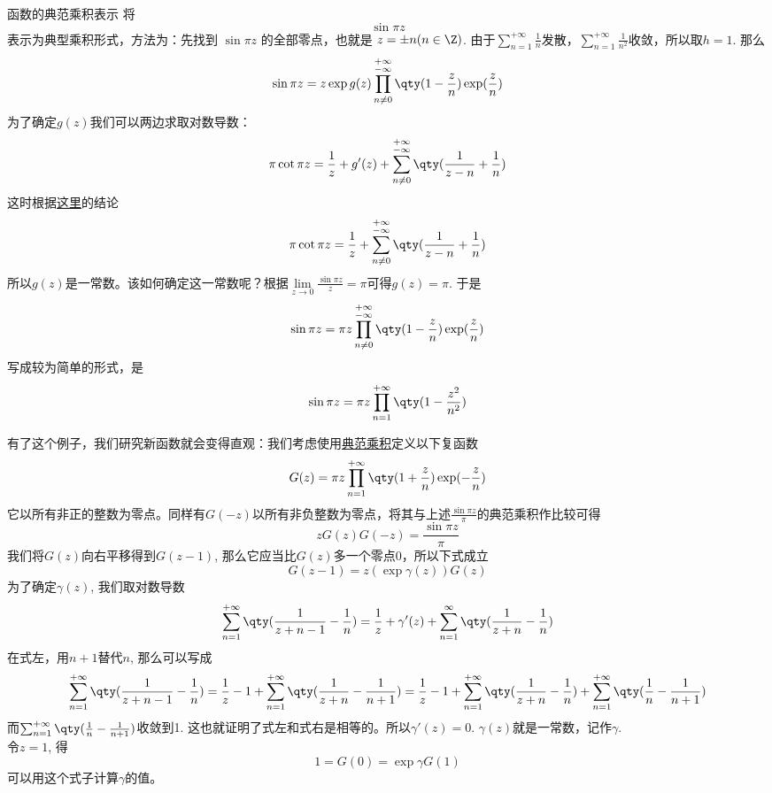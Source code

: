 \documentclass[UTF8]{ctexart}
\begin{document}
        \begin{xmp}
            {函数的典范乘积表示}
            将
            \[\sin \pi z\]
            表示为典型乘积形式，方法为：先找到 \(\sin\pi z\) 的全部零点，也就是 \(z=\pm n(n\in\Z)\). 由于$\sum_{n=1}^{+\infty}\frac{1}{n}$发散，$\sum_{n=1}^{+\infty}\frac{1}{n^2}$收敛，所以取$h=1$. 那么
            \[\sin\pi z=z\exp g(z)\prod_{n\neq 0}^{\substack{+\infty\\ -\infty}}\qty(1-\frac{z}{n})\exp(\frac{z}{n})\]
            为了确定$g(z)$我们可以两边求取对数导数：
            \[\pi\cot\pi z=\frac{1}{z}+g'(z)+\sum_{n\neq 0}^{\substack{+\infty\\ -\infty}}\qty(\frac{1}{z-n}+\frac{1}{n})\]
            这时根据\hyperref[xmp:64]{这里}的结论
            \[\pi\cot\pi z=\frac{1}{z}+\sum_{n\neq 0}^{\substack{+\infty\\ -\infty}}\qty(\frac{1}{z-n}+\frac{1}{n})\]
            所以$g(z)$是一常数。该如何确定这一常数呢？根据$\lim\limits_{z\to 0}\frac{\sin\pi z}{z}=\pi$可得$g(z)=\pi$. 于是
            \[\sin\pi z=\pi z\prod_{n\neq 0}^{\substack{+\infty\\ -\infty}}\qty(1-\frac{z}{n})\exp(\frac{z}{n})\]
            写成较为简单的形式，是
            \[\sin\pi z=\pi z\prod_{n=1}^{+\infty}\qty(1-\frac{z^2}{n^2})\]
        \end{xmp}

        有了这个例子，我们研究新函数就会变得直观：我们考虑使用\hyperref[dfn:CanonicalProduct]{典范乘积}定义以下复函数
        \[G(z)=\pi z\prod_{n=1}^{+\infty}\qty(1+\frac{z}{n})\exp(-\frac{z}{n})\]
        它以所有非正的整数为零点。同样有$G(-z)$以所有非负整数为零点，将其与上述$\frac{\sin\pi z}{\pi}$的典范乘积作比较可得
        \[zG(z)G(-z)=\frac{\sin\pi z}{\pi}\]
        我们将$G(z)$向右平移得到$G(z-1)$, 那么它应当比$G(z)$多一个零点0，所以下式成立
        \[G(z-1)=z(\exp\gamma(z))G(z)\]
        为了确定$\gamma(z)$, 我们取对数导数
        \[\sum_{n=1}^{+\infty}\qty(\frac{1}{z+n-1}-\frac{1}{n})=\frac{1}{z}+\gamma'(z)+\sum_{n=1}^{\infty}\qty(\frac{1}{z+n}-\frac{1}{n})\]
        在式左，用$n+1$替代$n$, 那么可以写成
        \[\sum_{n=1}^{+\infty}\qty(\frac{1}{z+n-1}-\frac{1}{n})=\frac{1}{z}-1+\sum_{n=1}^{+\infty}\qty(\frac{1}{z+n}-\frac{1}{n+1})=\frac{1}{z}-1+\sum_{n=1}^{+\infty}\qty(\frac{1}{z+n}-\frac{1}{n})+\sum_{n=1}^{+\infty}\qty(\frac{1}{n}-\frac{1}{n+1})\]
        而$\sum_{n=1}^{+\infty}\qty(\frac{1}{n}-\frac{1}{n+1})$收敛到1. 这也就证明了式左和式右是相等的。所以$\gamma'(z)=0$. $\gamma(z)$就是一常数，记作$\gamma$.\\
        令$z=1$, 得
        \[1=G(0)=\exp\gamma G(1)\]
        可以用这个式子计算$\gamma$的值。
\end{document}

